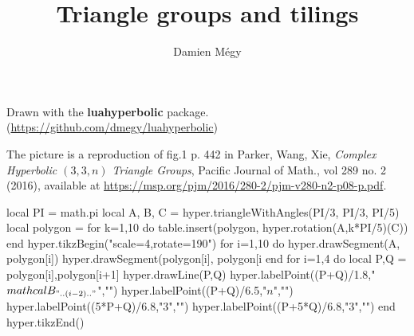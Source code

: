 \documentclass[a4paper]{article}
\begin{document}
\title{Triangle groups and tilings}
\author{Damien Mégy}
\date{}
\maketitle
\pagestyle{empty}
\thispagestyle{empty}
Drawn with the \textbf{\textsf{luahyperbolic}} package. (\url{https://github.com/dmegy/luahyperbolic}) 

The picture is a reproduction of fig.1 p. 442 in Parker, Wang, Xie, \emph{Complex Hyperbolic $(3,3,n)$ Triangle Groups}, Pacific Journal of Math., vol 289 no. 2 (2016), available at \url{https://msp.org/pjm/2016/280-2/pjm-v280-n2-p08-p.pdf}.

\begin{codeandresult}
\begin{luacode*}
local PI = math.pi
local A, B, C = hyper.triangleWithAngles(PI/3, PI/3, PI/5)
local polygon = {}
for k=1,10 do
	table.insert(polygon, hyper.rotation(A,k*PI/5)(C))
end
hyper.tikzBegin("scale=4,rotate=190")
for i=1,10 do
	hyper.drawSegment(A, polygon[i])
	hyper.drawSegment(polygon[i], polygon[i%
end
for i=1,4 do
	local P,Q = polygon[i],polygon[i+1]
	hyper.drawLine(P,Q)
	hyper.labelPoint((P+Q)/1.8,"$\\mathcal{B}_{".. (i-2).."}$","")
	hyper.labelPoint((P+Q)/6.5,"$n$","")
	hyper.labelPoint((5*P+Q)/6.8,"$3$","")
	hyper.labelPoint((P+5*Q)/6.8,"$3$","")
end
hyper.tikzEnd()
\end{luacode*}
\end{codeandresult}
\end{document}
